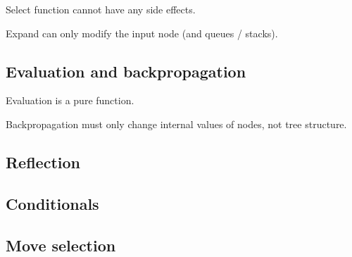 Select function cannot have any side effects.

Expand can only modify the input node (and queues / stacks).


\subsection{Evaluation and backpropagation}
Evaluation is a pure function.

Backpropagation must only change internal values of nodes, not
tree structure.

\subsection{Reflection}


\subsection{Conditionals}

\subsection{Move selection}